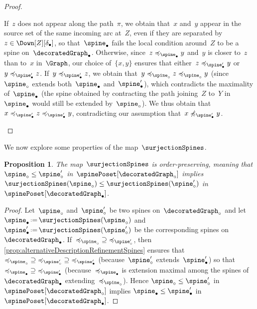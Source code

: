 \documentclass{amsart}
\newtheorem{proposition}[theorem]{Proposition}
\theoremstyle{definition}
\newcommand{\eqdef}{\mbox{\,\raisebox{0.2ex}{\scriptsize\ensuremath{\mathrm:}}\ensuremath{=}\,}} %
\newcommand{\decoration}{\delta}
\begin{document}
\begin{proof}
\begin{enumerate}[(i)]
    If~$z$ does not appear along the path~$\pi$, we obtain that~$x$ and~$y$ appear in the source set of the same incoming arc at~$Z$, even if they are separated by~$z \in \Down[Z][\decoration_\bullet]$, so that~$\spine_\bullet$ fails the local condition around~$Z$ to be a spine on~$\decoratedGraph_\bullet$.
    Otherwise, since~$z \preccurlyeq_{\spine_\bullet} y$ and~$y$ is closer to~$z$ than to~$x$ in~$\Graph$, our choice of~$\{x,y\}$ ensures that either~$z \preccurlyeq_{\spine_\bullet'} y$ or~$y \preccurlyeq_{\spine_\bullet'} z$.
    If~$y \preccurlyeq_{\spine_\bullet'} z$, we obtain that~$y \preccurlyeq_{\spine_\circ} z \preccurlyeq_{\spine_\circ} y$ (since~$\spine_\circ$ extends both~$\spine_\bullet$ and~$\spine_\bullet'$), which contradicts the maximality of~$\spine_\bullet$ (the spine obtained by contracting the path joining~$Z$ to~$Y$ in~$\spine_\bullet$ would still be extended by~$\spine_\circ$).
    We thus obtain that~$x \preccurlyeq_{\spine_\bullet'} z \preccurlyeq_{\spine_\bullet'} y$, contradicting our assumption that~$x \not\preccurlyeq_{\spine_\bullet'} y$.
    \qedhere
  \end{enumerate}
\end{proof}

We now explore some properties of the map~$\surjectionSpines$.

\begin{proposition}
  \label{prop:orderPreservingRefinementSpines}
  The map~$\surjectionSpines$ is order-preserving, meaning that $\spine_\circ \le \spine_\circ'$ in~$\spinePoset[\decoratedGraph_\circ]$ implies~$\surjectionSpines(\spine_\circ) \le \surjectionSpines(\spine_\circ')$ in~$\spinePoset[\decoratedGraph_\bullet]$.
\end{proposition}

\begin{proof}
  Let~$\spine_\circ$ and~$\spine_\circ'$ be two spines on~$\decoratedGraph_\circ$ and let~$\spine_\bullet \eqdef \surjectionSpines(\spine_\circ)$ and~$\spine_\bullet' \eqdef \surjectionSpines(\spine_\circ')$ be the corresponding spines on~$\decoratedGraph_\bullet$.
  If~${\preccurlyeq_{\spine_\circ}} \supseteq {\preccurlyeq_{\spine_\circ'}}$, then \cref{prop:alternativeDescriptionRefinementSpines} ensures that~${\preccurlyeq_{\spine_\circ}} \supseteq {\preccurlyeq_{\spine_\circ'}} \supseteq {\preccurlyeq_{\spine_\bullet'}}$ (because~$\spine_\circ'$ extends~$\spine_\bullet'$) so that~${\preccurlyeq_{\spine_\bullet}} \supseteq {\preccurlyeq_{\spine_\bullet'}}$ (because~$\preccurlyeq_{\spine_\bullet}$ is extension maximal among the spines of~$\decoratedGraph_\bullet$ extending~$\preccurlyeq_{\spine_\circ}$).
  Hence $\spine_\circ \le \spine_\circ'$  in~$\spinePoset[\decoratedGraph_\circ]$ implies $\spine_\bullet \le \spine_\bullet'$ in~$\spinePoset[\decoratedGraph_\bullet]$.
\end{proof}
\end{document}
